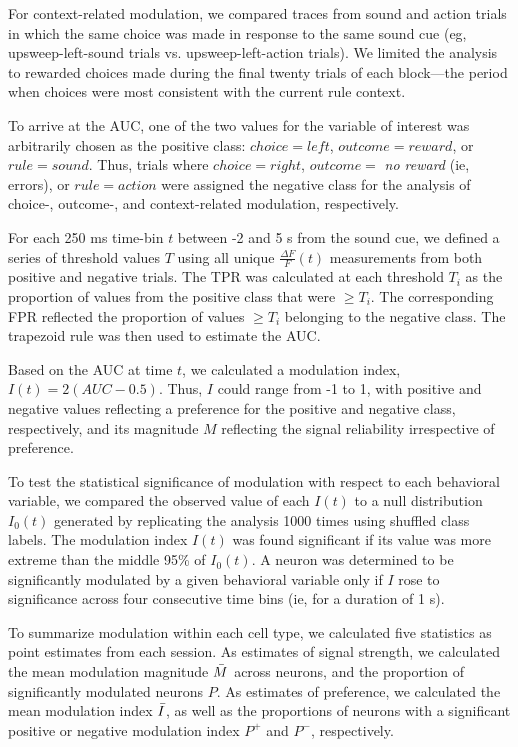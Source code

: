 For context-related modulation, we compared traces from sound and action trials in which the same choice was made in response to the same sound cue (eg, upsweep-left-sound trials vs. upsweep-left-action trials). We limited the analysis to rewarded choices made during the final twenty trials of each block---the period when choices were most consistent with the current rule context. 

To arrive at the AUC, one of the two values for the variable of interest was arbitrarily chosen as the positive class: $\mathit{choice}=\mathit{left}$, $\mathit{outcome}=\mathit{reward}$, or $\mathit{rule}=\mathit{sound}$. Thus, trials where $\mathit{choice}=\mathit{right}$, $\mathit{outcome}=$ \emph{no reward} (ie, errors), or $\mathit{rule}=\mathit{action}$ were assigned the negative class for the analysis of choice-, outcome-, and context-related modulation, respectively. 

For each 250 ms time-bin $t$ between -2 and 5 s from the sound cue, we defined a series of threshold values $T$ using all unique $\frac{\Delta F}{F}(t)$ measurements from both positive and negative trials. The TPR was calculated at each threshold $T_i$ as the proportion of values from the positive class that were $\ge T_i$. The corresponding FPR reflected the proportion of values $\ge T_i$ belonging to the negative class.  The trapezoid rule was then used to estimate the AUC.

Based on the AUC at time $t$, we calculated a modulation index, $I(t) = 2(\mathit{AUC} - 0.5)$. Thus, $I$ could range from -1 to 1, with positive and negative values reflecting a preference for the positive and negative class, respectively, and its magnitude $M$ reflecting the signal reliability irrespective of preference. 

To test the statistical significance of modulation with respect to each behavioral variable, we compared the observed value of each $I(t)$ to a null distribution $I_0(t)$ generated by replicating the analysis 1000 times using shuffled class labels. The modulation index $I(t)$ was found significant if its value was more extreme than the middle 95\% of $I_0(t)$. A neuron was determined to be significantly modulated by a given behavioral variable only if $I$ rose to significance across four consecutive time bins (ie, for a duration of 1 s).

To summarize modulation within each cell type, we calculated five statistics as point estimates from each session. As estimates of signal strength, we calculated the mean modulation magnitude $\Bar{M}$ across neurons, and the proportion of significantly modulated neurons $P$. As estimates of preference, we calculated the mean modulation index $\Bar{I}$, as well as the proportions of neurons with a significant positive or negative modulation index $P^+$  and $P^-$, respectively.

